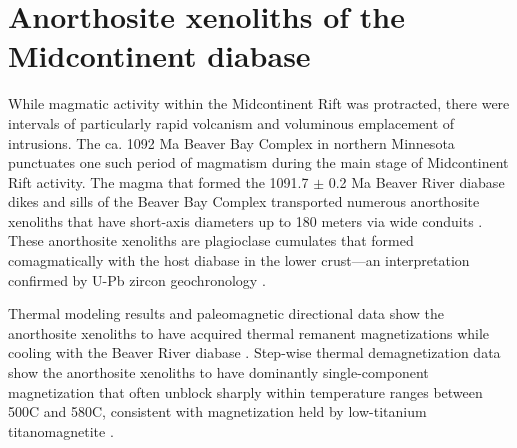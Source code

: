 \documentclass[9pt,twocolumn,twoside,lineno]{pnas-new}
\begin{document}
\section*{Anorthosite xenoliths of the Midcontinent diabase}

While magmatic activity within the Midcontinent Rift was protracted, there were intervals of particularly rapid volcanism and voluminous emplacement of intrusions. The ca. 1092 Ma Beaver Bay Complex in northern Minnesota punctuates one such period of magmatism during the main stage of Midcontinent Rift activity. The magma that formed the 1091.7 $\pm$ 0.2 Ma Beaver River diabase dikes and sills of the Beaver Bay Complex transported numerous anorthosite xenoliths that have short-axis diameters up to 180 meters via wide conduits \cite{Boerboom2004a, Boerboom2006b}. These anorthosite xenoliths are plagioclase cumulates that formed comagmatically with the host diabase in the lower crust---an interpretation confirmed by U-Pb zircon geochronology \cite{Zhang2021b}. 

Thermal modeling results and paleomagnetic directional data show the anorthosite xenoliths to have acquired thermal remanent magnetizations while cooling with the Beaver River diabase \cite{Zhang2021b}. Step-wise thermal demagnetization data show the anorthosite xenoliths to have dominantly single-component magnetization that often unblock sharply within temperature ranges between 500\textdegree C and 580\textdegree C, consistent with magnetization held by low-titanium titanomagnetite \cite{Zhang2021b}.
\end{document}
